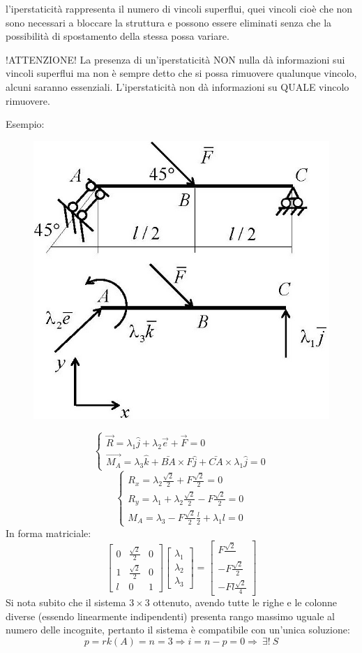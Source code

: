 \documentclass{article}
\begin{document}
\begin{adjustwidth}{2in}{}
l'iperstaticità rappresenta il numero di vincoli superflui, quei vincoli cioè che non sono necessari a bloccare la struttura e possono essere eliminati senza che la possibilità di spostamento della stessa possa variare. \newline

!ATTENZIONE! \newline
La presenza di un'iperstaticità NON nulla dà informazioni sui vincoli superflui ma non è sempre detto che si possa rimuovere qualunque vincolo, alcuni saranno essenziali. L'iperstaticità non dà informazioni su QUALE vincolo rimuovere.

Esempio: \newline
\begin{figure}[H]
	\centering
	\includegraphics[width=0.25\linewidth]{"immagini/1.PARTE1_Pagina_46"}
\end{figure}
\[
\begin{cases}
\vec{R} = \lambda_{1}\hat{j} + \lambda_{2}\vec{e} + \vec{F} = 0 \\
\vec{M_{A}} = \lambda_{3}\hat{k} + \bar{BA} \times F\hat{j} + \bar{CA} \times \lambda_{1}\hat{j} = 0
\end{cases}
\]
\[
\begin{cases}
	R_{x} = \lambda_{2}\frac{\sqrt{2}}{2} + F\frac{\sqrt{2}}{2} = 0 \\
	R_{y} = \lambda_{1} + \lambda_{2}\frac{\sqrt{2}}{2} - F\frac{\sqrt{2}}{2} = 0\\
	M_{A} = \lambda_{3} -F\frac{\sqrt{2}}{2}\frac{l}{2} + \lambda_{1}l = 0
\end{cases}
\]
In forma matriciale: 
\[
\left[ \begin{array}{ccc}
	0 & \frac{\sqrt{2}}{2} & 0 \\
	1 & \frac{\sqrt{2}}{2} & 0 \\
	l & 0 & 1
\end{array}\right] \left[ \begin{array}{c}
\lambda_{1} \\
\lambda_{2} \\
\lambda_{3}
\end{array}\right] = \left[ \begin{array}{c}
F\frac{\sqrt{2}}{} \\
-F\frac{\sqrt{2}}{2} \\
-Fl\frac{\sqrt{2}}{4}
\end{array}\right] 
\]
Si nota subito che il sistema $3 \times 3$ ottenuto, avendo tutte le righe e le colonne diverse (essendo linearmente indipendenti) presenta rango massimo uguale al numero delle incognite, pertanto il sistema è compatibile con un'unica soluzione:
\[p = rk(A) = n = 3 \Rightarrow i = n - p = 0 \Rightarrow ~ \exists! ~S\]


\end{adjustwidth}
\end{document}
